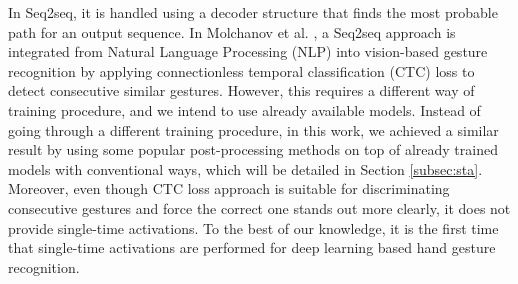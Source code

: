In Seq2seq, it is handled using a decoder structure that finds the most probable path for an output sequence.  In Molchanov et al. \cite{molchanov_online_2016}, a Seq2seq approach is integrated from Natural  Language Processing (NLP)  into vision-based gesture recognition by applying connectionless temporal classification (CTC)  loss to detect consecutive similar gestures. However, this requires a different way of training procedure, and we intend to use already available models. Instead of going through a different training procedure,  in this work,  we achieved a similar result by using some popular post-processing methods on top of already trained models with conventional ways, which will be detailed in Section \ref{subsec:sta}. Moreover,  even though CTC loss approach is suitable for discriminating consecutive gestures and force the correct one stands out more clearly, it does not provide single-time activations. To the best of our knowledge, it is the first time that single-time activations are performed for deep learning based hand gesture recognition.